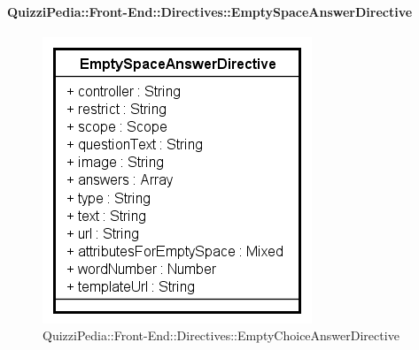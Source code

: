 	\paragraph{QuizziPedia::Front-End::Directives::EmptySpaceAnswerDirective}
		
		\label{QuizziPedia::Front-End::Directives::EmptySpaceAnswerDirective}
		
		\begin{figure}[ht]
			\centering
			\includegraphics[scale=0.80,keepaspectratio]{UML/Classi/Front-End/QuizziPedia_Front-end_Templates_EmptySpaceAnswerTemplate.png}
			\caption{QuizziPedia::Front-End::Directives::EmptyChoiceAnswerDirective}
		\end{figure} \FloatBarrier
		
